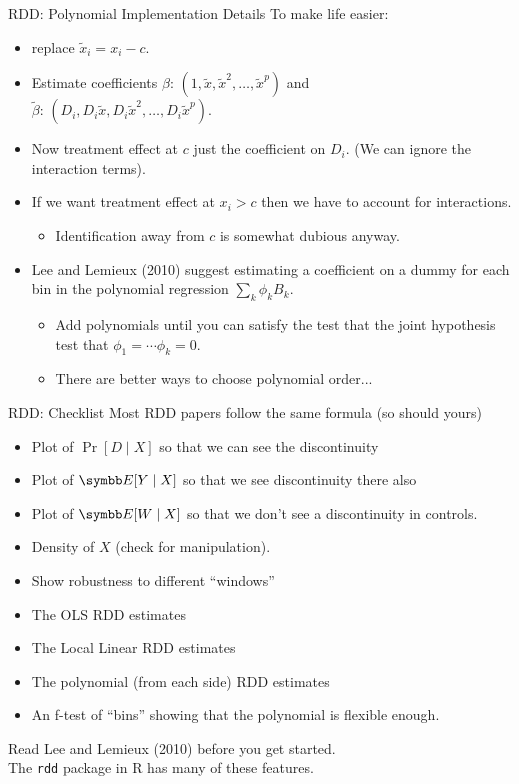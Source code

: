 \documentclass[aspectratio=169,11pt]{beamer}
\begin{document}
\begin{frame}{RDD: Polynomial Implementation Details}
To make life easier:
\begin{itemize}
\item replace $\tilde{x}_i = x_i - c$.
\item Estimate coefficients $\beta$: $(1, \tilde{x}, \tilde{x}^2, \ldots, \tilde{x}^p)$ and\\
 $\tilde{\beta}$: $(D_i, D_i \tilde{x},D_i \tilde{x}^2, \ldots, D_i \tilde{x}^p)$.
 \item Now treatment effect at $c$ just the coefficient on $D_i$. (We can ignore the interaction terms).
 \item If we want treatment effect at $x_i > c$ then we have to account for interactions.
 \begin{itemize}
 \item Identification away from $c$ is somewhat dubious anyway.
\end{itemize}
\item Lee and Lemieux (2010) suggest estimating a coefficient on a dummy for each bin in the polynomial regression $\sum_{k} \phi_k B_k$.
 \begin{itemize}
 \item Add polynomials until you can satisfy the test that the joint hypothesis test that $\phi_1 = \cdots \phi_k= 0$.
\item There are better ways to choose polynomial order...
\end{itemize}
\end{itemize}
\end{frame}

	
\begin{frame}{RDD: Checklist}
Most RDD papers follow the same formula (so should yours)
\begin{itemize}
\item Plot of $\Pr[D \mid X]$ so that we can see the discontinuity
\item Plot of $\E[Y \mid X]$ so that we see discontinuity there also
\item Plot of $\E[W \mid X ]$ so that we don't see a discontinuity in controls.
\item Density of $X$ (check for manipulation).
\item Show robustness to different ``windows''
\item The OLS RDD estimates
\item The Local Linear RDD estimates
\item The polynomial (from each side) RDD estimates
\item An f-test of ``bins'' showing that the polynomial is flexible enough.
\end{itemize}
Read Lee and Lemieux (2010) before you get started.\\
The \texttt{rdd} package in R has many of these features.
\end{frame}
\end{document}
